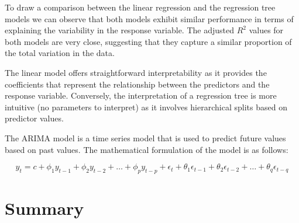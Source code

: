 \documentclass[12 pt]{scrartcl}
\numberwithin{equation}{section}
\begin{document}
\begin{table}[H]
    \centering
    \caption{Results for the fine tunned regression tree and random forest models for the diastolic blood pressure.}
    \label{tab:cv}
    \end{table}


To draw a comparison between the linear regression and the regression tree models
we can observe that 
both models exhibit similar performance in terms of explaining the variability in the response variable. 
The adjusted $R^2$ values for both models are very close, suggesting that they capture a similar 
proportion of the total variation in the data.

The linear model offers straightforward interpretability as it provides the coefficients that represent the relationship between the predictors and the response variable. 
Conversely, the interpretation of a regression tree is more intuitive (no parameters to interpret) as it involves hierarchical splits based on predictor values.

The ARIMA model is a time series model that is used to predict future values based on past values.
The mathematical formulation of the model is as follows:

\begin{equation}
    \label{eq:arima}
    y_t = c + \phi_1 y_{t-1} + \phi_2 y_{t-2} + \dots + \phi_p y_{t-p} + \epsilon_t + \theta_1 \epsilon_{t-1} + \theta_2 \epsilon_{t-2} + \dots + \theta_q \epsilon_{t-q}   
\end{equation}

\section{Summary}
\label{sec:Summary}
\end{document}
